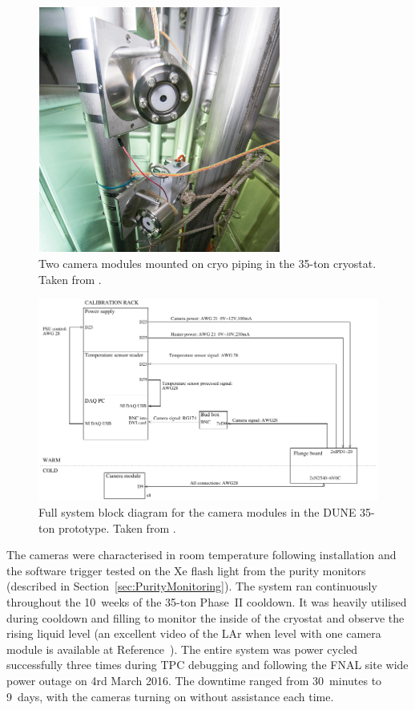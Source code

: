 \begin{figure}
  \centering
  \includegraphics[width=8cm]{35tonCameraMounted.pdf}
  \caption[Two camera modules mounted on cryo piping in the 35-ton cryostat.]{Two camera modules mounted on cryo piping in the 35-ton cryostat.  Taken from \cite{35tonCameras2017}.}
  \label{fig:35tonCameraMounted}
\end{figure}

\begin{figure}
  \centering
  \includegraphics[width=12cm]{35tonCameraDiagram.pdf}
  \caption[Full system block diagram for the camera modules in the DUNE 35-ton prototype.]{Full system block diagram for the camera modules in the DUNE 35-ton prototype.  Taken from \cite{35tonCameras2017}.}
  \label{fig:35tonCameraDiagram}
\end{figure}

The cameras were characterised in room temperature following installation and the software trigger tested on the Xe flash light from the purity monitors (described in Section~\ref{sec:PurityMonitoring}).  The system ran continuously throughout the 10~weeks of the 35-ton Phase~II cooldown.  It was heavily utilised during cooldown and filling to monitor the inside of the cryostat and observe the rising liquid level (an excellent video of the LAr when level with one camera module is available at Reference~\cite{35tonCameraVideo}).  The entire system was power cycled successfully three times during TPC debugging and following the FNAL site wide power outage on 4rd March 2016.  The downtime ranged from 30~minutes to 9~days, with the cameras turning on without assistance each time.

